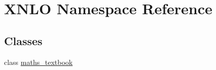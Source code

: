 \hypertarget{namespace_x_n_l_o}{}\section{X\+N\+LO Namespace Reference}
\label{namespace_x_n_l_o}
\subsection*{Classes}
\begin{DoxyCompactItemize}
\item 
class \hyperlink{class_x_n_l_o_1_1maths__textbook}{maths\+\_\+textbook}
\end{DoxyCompactItemize}
